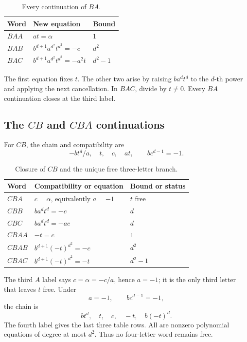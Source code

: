 \documentclass[11pt]{article}
\theoremstyle{definition}
\begin{document}
\begin{table}[t]
\centering
\small
\caption{Every continuation of \(BA\).}
\label{tab:BA}
\begin{tabularx}{\textwidth}{@{}l X l@{}}
\toprule
Word & New equation & Bound\\
\midrule
\(BAA\) & \(at=\alpha\) & \(1\)\\
\(BAB\) & \(b^{d+1}a^{d^2}t^{d^2}=-c\) & \(d^2\)\\
\(BAC\) & \(b^{d+1}a^{d^2}t^{d^2}=-a^2t\) & \(d^2-1\)\\
\bottomrule
\end{tabularx}
\end{table}

The first equation fixes \(t\). The other two arise by raising \(ba^dt^d\) to the \(d\)-th power and applying the next cancellation. In \(BAC\), divide by \(t\neq0\). Every \(BA\) continuation closes at the third label.

\subsection{The \texorpdfstring{\(CB\)}{CB} and \texorpdfstring{\(CBA\)}{CBA} continuations}

For \(CB\), the chain and compatibility are
\begin{equation}
 -bt^d/a,\quad t,\quad c,\quad at,
 \qquad bc^{d-1}=-1.
 \label{eq:CB-chain}
\end{equation}

\begin{table}[t]
\centering
\small
\caption{Closure of \(CB\) and the unique free three-letter branch.}
\label{tab:CB-CBA}
\begin{tabularx}{\textwidth}{@{}l X l@{}}
\toprule
Word & Compatibility or equation & Bound or status\\
\midrule
\(CBA\) & \(c=\alpha\), equivalently \(a=-1\) & \(t\) free\\
\(CBB\) & \(ba^dt^d=-c\) & \(d\)\\
\(CBC\) & \(ba^dt^d=-ac\) & \(d\)\\
\(CBAA\) & \(-t=c\) & \(1\)\\
\(CBAB\) & \(b^{d+1}(-t)^{d^2}=-c\) & \(d^2\)\\
\(CBAC\) & \(b^{d+1}(-t)^{d^2}=-t\) & \(d^2-1\)\\
\bottomrule
\end{tabularx}
\end{table}

The third \(A\) label says \(c=\alpha=-c/a\), hence \(a=-1\); it is the only third letter that leaves \(t\) free. Under
\begin{equation}
 a=-1,\qquad bc^{d-1}=-1,
 \label{eq:CBA-compatibility}
\end{equation}
the chain is
\begin{equation}
 bt^d,\quad t,\quad c,\quad -t,\quad b(-t)^d.
 \label{eq:CBA-chain}
\end{equation}
The fourth label gives the last three table rows. All are nonzero polynomial equations of degree at most \(d^2\). Thus no four-letter word remains free.
\end{document}
